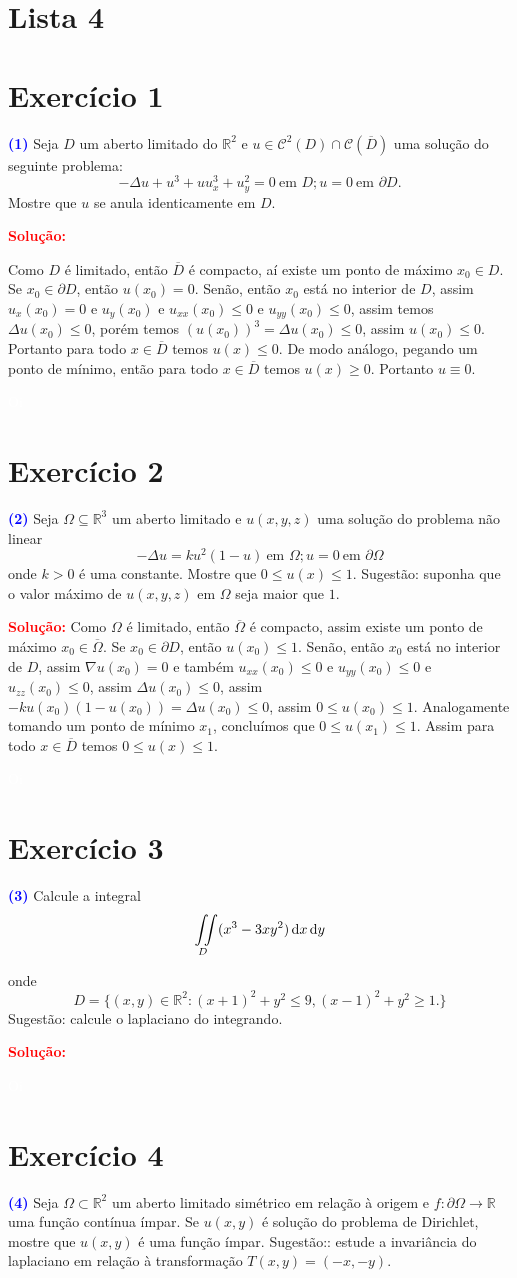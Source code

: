 \documentclass[11pt,a4paper]{article}
\newcommand{\exercicio}[1]{\section*{Exercício #1} \textcolor{blue}{\bf(#1)}}
\newcommand{\solucao}[1]{\begin{mdframed}[style=MyFrame]
\textbf{\textcolor{red}{Solução:}} #1
\end{mdframed}\textcolor{white}{Oi} \newline}
\begin{document}
\section{\textcolor{Floresta}{Lista 4}}

\exercicio{1}
Seja $D$ um aberto limitado do $\mathbb{R}^2$ e $u \in \mathcal{C}^2(D) \cap \mathcal{C}(\overline{D})$ uma solução do seguinte problema:
\[
- \Delta u + u^3 + uu_x^3 + u^2_y = 0 \ \mbox{em }D; u = 0 \ \mbox{em } \partial D.
\]
Mostre que $u$ se anula identicamente em $D.$

\solucao{

Como $D$ é limitado, então $\overline{D}$ é compacto, aí existe um ponto de máximo $x_0\in D$. Se $x_0\in \partial D$, então $u(x_0)=0$. Senão, então $x_0$ está no interior de $D$, assim $u_x(x_0)=0$ e $u_y(x_0)$ e $u_{xx}(x_0)\leq 0$ e $u_{yy}(x_0)\leq 0$, assim temos $\Delta u(x_0)\leq 0$, porém temos $(u(x_0))^3=\Delta u(x_0)\leq 0$, assim $u(x_0)\leq 0$. Portanto para todo $x\in \overline{D}$ temos $u(x)\leq 0$. De modo análogo, pegando um ponto de mínimo, então para todo $x\in \overline{D}$ temos $u(x)\geq 0$. Portanto $u\equiv 0$.
}

\exercicio{2}
Seja $\Omega \subseteq \mathbb{R}^3$ um aberto limitado e $u(x, y, z)$ uma solução do problema não linear
\[
- \Delta u = ku^2(1 - u) \ \mbox{em } \Omega; u = 0 \ \mbox{em } \partial \Omega
\]
onde $k > 0$ é uma constante. Mostre que $0 \le u(x) \le 1.$
Sugestão: suponha que o valor máximo de $u(x, y, z)$ em $\Omega$ seja maior que $1.$

\solucao{
Como $\Omega$ é limitado, então $\overline{\Omega}$ é compacto, assim existe um ponto de máximo $x_0\in\overline{\Omega}$. Se $x_0\in\partial D$, então $u(x_0)\leq 1$. Senão, então $x_0$ está no interior de $D$, assim $\nabla u(x_0)=0$ e também $u_{xx}(x_0)\leq 0$ e $u_{yy}(x_0)\leq 0$ e $u_{zz}(x_0)\leq 0$, assim $\Delta u(x_0)\leq 0$, assim $-ku(x_0)(1-u(x_0))=\Delta u(x_0)\leq 0$, assim $0\leq u(x_0)\leq 1$. Analogamente tomando um ponto de mínimo $x_1$, concluímos que $0\leq u(x_1)\leq 1$. Assim para todo $x\in\overline{D}$ temos $0\leq u(x)\leq 1$.
}

\exercicio{3}
Calcule a integral
\[
\iint\limits_{D} (x^3 - 3xy^2) \dif x \dif y
\]

onde
\[
D = \{(x, y) \in \mathbb{R}^2: (x + 1)^2 + y^2 \le 9, (x - 1)^2 + y^2 \ge 1.\}
\]
Sugestão: calcule o laplaciano do integrando.
\solucao{}


\exercicio{4}
Seja $\Omega \subset \mathbb{R}^2$ um aberto limitado simétrico em relação à origem e $f \colon \partial \Omega \to \mathbb{R}$ uma função contínua ímpar. Se $u(x, y)$ é solução do problema de Dirichlet, mostre que $u(x, y)$  é uma função ímpar.
Sugestão:: estude a invariância do laplaciano em relação à transformação $T(x, y) = (-x, -y).$
\end{document}
